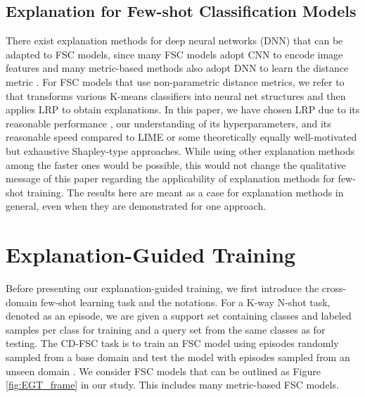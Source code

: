 \documentclass[a4paper,conference]{IEEEtran}
\begin{document}
\subsection{Explanation for Few-shot Classification Models}
There exist explanation methods for deep neural networks (DNN) \cite{LRP:bach2015pixel, DEEPTAYLOR:Lmontavon2017explaining, GRADIENT:simonyan2013deep, GuidebackPropagation:springenberg2014striving, GRADCAM:selvaraju2017grad, GNNLRP:schnake2020xai} that can be adapted to FSC models, since many FSC models adopt CNN to encode image features and many metric-based methods also adopt DNN to learn the distance metric \cite{RN:sung2018learning, FEWGNN:garcia2018fewshot, TPN:liu2018learning}. For FSC models that use non-parametric distance metrics, we refer to \cite{Explainkmeans:kauffmann2019clustering} that transforms various K-means classifiers into neural net structures and then applies LRP to obtain explanations. 
In this paper, we have chosen LRP due to its reasonable performance \cite{COMPARISON:poerner2018evaluating}, our understanding of its hyperparameters, and its reasonable speed compared to LIME or some theoretically equally well-motivated but exhaustive Shapley-type approaches. While using other explanation methods among the faster ones would be possible, this would not change the qualitative message of this paper regarding the applicability of explanation methods for few-shot training. The results here are meant as a case for explanation methods in general, even when they are demonstrated for one approach. 

\section{Explanation-Guided Training}
\label{sec:EGT}
Before presenting our explanation-guided training, we first introduce the cross-domain few-shot learning task and the notations.
For a K-way N-shot task, denoted as an episode, we are given a support set  containing  classes and  labeled samples per class for training and a query set  from the same classes as  for testing. The CD-FSC task is to train an FSC model using episodes  randomly sampled from a base domain  and test the model with episodes sampled from an unseen domain .
We consider FSC models that can be outlined as Figure \ref{fig:EGT_frame} in our study. This includes many metric-based FSC models. 
\end{document}
